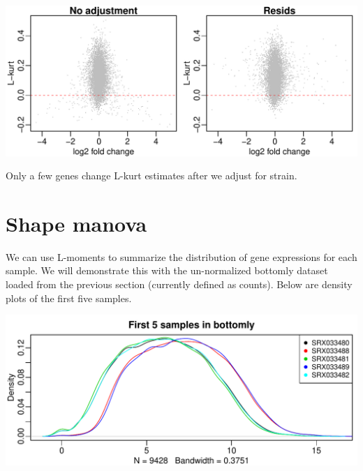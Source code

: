 \documentclass[a4paper, 10pt]{article}\usepackage[]{graphicx}\usepackage[]{color}
\makeatletter
\def\maxwidth{ %
  \ifdim\Gin@nat@width>\linewidth
    \linewidth
  \else
    \Gin@nat@width
  \fi
}
\newenvironment{knitrout}{}{} %
\makeatother
\begin{document}
\begin{knitrout}\small
{}\color{fgcolor}

{\centering \includegraphics[width=\maxwidth]{figure/bottomly2-1} 

}



\end{knitrout}

\noindent Only a few genes change L-kurt estimates
after we adjust for strain.

\section{Shape manova}
We can use L-moments to summarize the distribution of gene expressions
for each sample. We will demonstrate this with the un-normalized 
bottomly dataset loaded from the previous section (currently defined as counts). 
Below are density plots of the first five samples.

\begin{knitrout}\small
{}\color{fgcolor}

{\centering \includegraphics[width=\maxwidth]{figure/shapeManova1-1} 

}



\end{knitrout}
\end{document}

